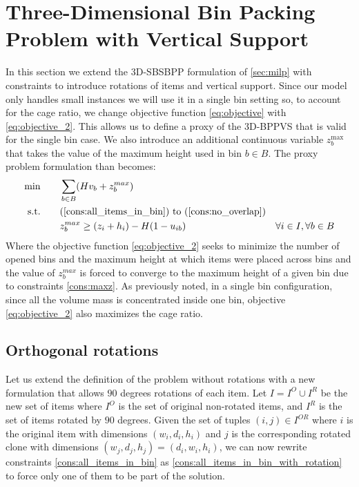 \section{Three-Dimensional Bin Packing Problem with Vertical Support}
In this section we extend the 3D-SBSBPP formulation of \cref{sec:milp} with constraints to introduce rotations of items and vertical support. Since our model only handles small instances we will use it in a single bin setting so, to account for the cage ratio, we change objective function \ref{eq:objective} with \ref{eq:objective_2}.
This allows us to define a proxy of the 3D-BPPVS that is valid for the single bin case.
We also introduce an additional continuous variable $z_b^\text{max}$ that takes the value of the maximum height used in bin $b \in B$.
The proxy problem formulation than becomes:
\begin{align}
    \min       \qquad& \sum\limits_{b \in B} (H v_b + z^{max}_b) & \label{eq:objective_2} \\
    \text{s.t.} \qquad& \text{(\ref{cons:all_items_in_bin}) to (\ref{cons:no_overlap})} \\ 
                     & z^{max}_b \ge (z_i + h_i) - H(1-u_{ib}) & \forall i \in I, \forall b \in B \label{cons:maxz}
\end{align}
Where the objective function \ref{eq:objective_2} seeks to minimize the number of opened bins and the maximum height at which items were placed across bins and the value of $z^{max}_b$ is forced to converge to the maximum height of a given bin due to constraints \ref{cons:maxz}.
As previously noted, in a single bin configuration, since all the volume mass is concentrated inside one bin, objective \ref{eq:objective_2} also maximizes the cage ratio.
\subsection*{Orthogonal rotations}
\label{subsec:orthogonal_rotations}%

Let us extend the definition of the problem without rotations with a new formulation that allows $90$ degrees rotations of each item.
Let $I = I^O \cup I^R$ be the new set of items where $I^O$ is the set of original non-rotated items, and $I^R$ is the set of items rotated by $90$ degrees.
Given the set of tuples $(i, j) \in I^{OR}$ where $i$ is the original item with dimensions $(w_i, d_i, h_i)$ and $j$ is the corresponding rotated clone with dimensions $(w_j, d_j, h_j) = (d_i, w_i, h_i)$, we can now rewrite constraints \ref{cons:all_items_in_bin} as \ref{cons:all_items_in_bin_with_rotation} to force only one of them to be part of the solution.

